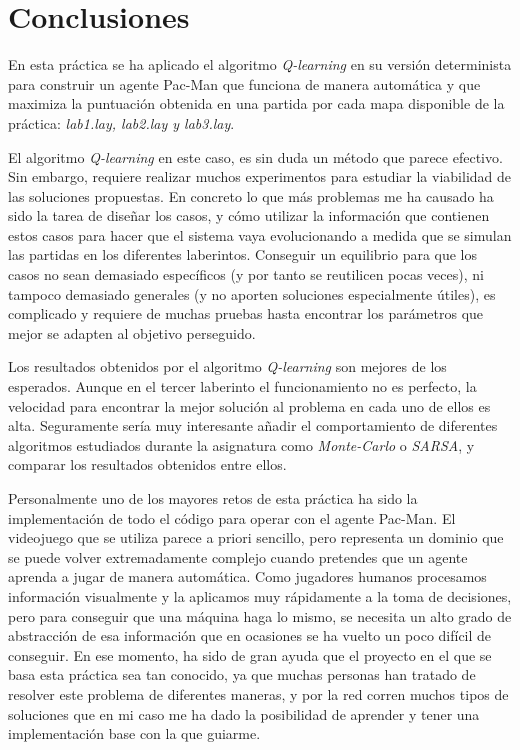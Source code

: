 \documentclass[11pt]{exam}
\begin{document}
\section{Conclusiones}\label{conclusiones}

En esta práctica se ha aplicado el algoritmo \textit{Q-learning} en su versión determinista para construir un agente Pac-Man que funciona de manera automática y que maximiza la puntuación obtenida en una partida por cada mapa disponible de la práctica: \textit{lab1.lay, lab2.lay y lab3.lay}.  
\vspace*{2mm}

El algoritmo \textit{Q-learning} en este caso, es sin duda un método que parece efectivo. Sin embargo, requiere realizar muchos experimentos para estudiar la viabilidad de las soluciones propuestas. En concreto lo que más problemas me ha causado ha sido la tarea de diseñar los casos, y cómo utilizar la información que contienen estos casos para hacer que el sistema vaya evolucionando a medida que se simulan las partidas en los diferentes laberintos. Conseguir un equilibrio para que los casos no sean demasiado específicos (y por tanto se reutilicen pocas veces), ni tampoco demasiado generales (y no aporten soluciones especialmente útiles), es complicado y requiere de muchas pruebas hasta encontrar los parámetros que mejor se adapten al objetivo perseguido.
\vspace*{2mm}

Los resultados obtenidos por el algoritmo \textit{Q-learning} son mejores de los esperados. Aunque en el tercer laberinto el funcionamiento no es perfecto, la velocidad para encontrar la mejor solución al problema en cada uno de ellos es alta. Seguramente sería muy interesante añadir el comportamiento de diferentes algoritmos estudiados durante la asignatura como \textit{Monte-Carlo} o \textit{SARSA}, y comparar los resultados obtenidos entre ellos.
\vspace*{2mm}

Personalmente uno de los mayores retos de esta práctica ha sido la implementación de todo el código para operar con el agente Pac-Man. El videojuego que se utiliza parece a priori sencillo, pero representa un dominio que se puede volver extremadamente complejo cuando pretendes que un agente aprenda a jugar de manera automática. Como jugadores humanos procesamos información visualmente y la aplicamos muy rápidamente a la toma de decisiones, pero para conseguir que una máquina haga lo mismo, se necesita un alto grado de abstracción de esa información que en ocasiones se ha vuelto un poco difícil de conseguir. En ese momento, ha sido de gran ayuda que el proyecto en el que se basa esta práctica sea tan conocido, ya que muchas personas han tratado de resolver este problema de diferentes maneras, y por la red corren muchos tipos de soluciones que en mi caso me ha dado la posibilidad de aprender y tener una implementación base con la que guiarme.
\end{document}
